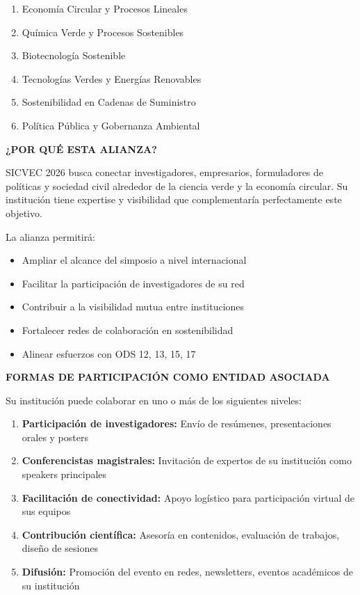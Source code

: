 \documentclass[12pt,a4paper]{article}
\begin{document}
\begin{enumerate}
  \item Economía Circular y Procesos Lineales
  \item Química Verde y Procesos Sostenibles
  \item Biotecnología Sostenible
  \item Tecnologías Verdes y Energías Renovables
  \item Sostenibilidad en Cadenas de Suministro
  \item Política Pública y Gobernanza Ambiental
\end{enumerate}

\vspace{0.5cm}

\noindent
\textbf{¿POR QUÉ ESTA ALIANZA?}

SICVEC 2026 busca conectar investigadores, empresarios, formuladores de políticas y sociedad civil alrededor de la ciencia verde y la economía circular. Su institución tiene expertise y visibilidad que complementaría perfectamente este objetivo.

La alianza permitirá:

\begin{itemize}
  \item Ampliar el alcance del simposio a nivel internacional
  \item Facilitar la participación de investigadores de su red
  \item Contribuir a la visibilidad mutua entre instituciones
  \item Fortalecer redes de colaboración en sostenibilidad
  \item Alinear esfuerzos con ODS 12, 13, 15, 17
\end{itemize}

\vspace{0.5cm}

\noindent
\textbf{FORMAS DE PARTICIPACIÓN COMO ENTIDAD ASOCIADA}

Su institución puede colaborar en uno o más de los siguientes niveles:

\begin{enumerate}
  \item \textbf{Participación de investigadores:} Envío de resúmenes, presentaciones orales y posters
  \item \textbf{Conferencistas magistrales:} Invitación de expertos de su institución como speakers principales
  \item \textbf{Facilitación de conectividad:} Apoyo logístico para participación virtual de sus equipos
  \item \textbf{Contribución científica:} Asesoría en contenidos, evaluación de trabajos, diseño de sesiones
  \item \textbf{Difusión:} Promoción del evento en redes, newsletters, eventos académicos de su institución
\end{enumerate}
\end{document}
